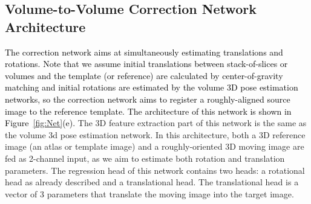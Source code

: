 \documentclass[journal,transmag]{IEEEtran}
\begin{document}
\subsection{Volume-to-Volume Correction Network Architecture}
\textcolor{black}{The correction network aims at simultaneously estimating translations and rotations.} \textcolor{black}{Note that we assume initial translations between stack-of-slices or volumes and the template (or reference) are calculated by center-of-gravity matching and initial rotations are estimated by the volume 3D pose estimation networks, so the correction network aims to register a roughly-aligned source image to the reference template. The architecture of this network is shown in Figure~\ref{fig:Net}(e).} The 3D feature extraction part of this network is the same as the volume 3d pose estimation network. In this architecture, both a 3D reference image (an atlas or template image) and a roughly-oriented 3D moving image are fed as 2-channel input, as we aim to estimate both rotation and translation parameters. The regression head of this network contains two heads: a rotational head as already described and a translational head. The translational head is a vector of 3 parameters that translate the moving image into the target image.

\end{document}
